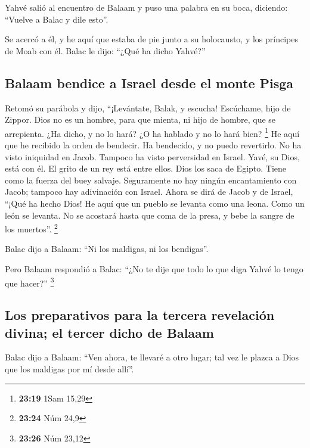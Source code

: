  Yahvé salió al encuentro de Balaam y puso una palabra en
su boca, diciendo: ``Vuelve a Balac y dile esto''.

 Se acercó a él, y he aquí que estaba de pie junto a su
holocausto, y los príncipes de Moab con él. Balac le dijo: ``¿Qué ha
dicho Yahvé?''

\hypertarget{balaam-bendice-a-israel-desde-el-monte-pisga}{%
\subsection{Balaam bendice a Israel desde el monte
Pisga}\label{balaam-bendice-a-israel-desde-el-monte-pisga}}

 Retomó su parábola y dijo, ``¡Levántate, Balak, y
escucha! Escúchame, hijo de Zippor.  Dios no es un
hombre, para que mienta, ni hijo de hombre, que se arrepienta. ¿Ha
dicho, y no lo hará? ¿O ha hablado y no lo hará bien? \footnote{\textbf{23:19}
  1Sam 15,29}  He aquí que he recibido la orden de
bendecir. Ha bendecido, y no puedo revertirlo.  No ha
visto iniquidad en Jacob. Tampoco ha visto perversidad en Israel. Yavé,
su Dios, está con él. El grito de un rey está entre ellos.
 Dios los saca de Egipto. Tiene como la fuerza del buey
salvaje.  Seguramente no hay ningún encantamiento con
Jacob; tampoco hay adivinación con Israel. Ahora se dirá de Jacob y de
Israel, ``¡Qué ha hecho Dios!  He aquí que un pueblo se
levanta como una leona. Como un león se levanta. No se acostará hasta
que coma de la presa, y bebe la sangre de los muertos''. \footnote{\textbf{23:24}
  Núm 24,9}

 Balac dijo a Balaam: ``Ni los maldigas, ni los
bendigas''.

 Pero Balaam respondió a Balac: ``¿No te dije que todo lo
que diga Yahvé lo tengo que hacer?'' \footnote{\textbf{23:26} Núm 23,12}

\hypertarget{los-preparativos-para-la-tercera-revelaciuxf3n-divina-el-tercer-dicho-de-balaam}{%
\subsection{Los preparativos para la tercera revelación divina; el
tercer dicho de
Balaam}\label{los-preparativos-para-la-tercera-revelaciuxf3n-divina-el-tercer-dicho-de-balaam}}

 Balac dijo a Balaam: ``Ven ahora, te llevaré a otro
lugar; tal vez le plazca a Dios que los maldigas por mí desde allí''.

